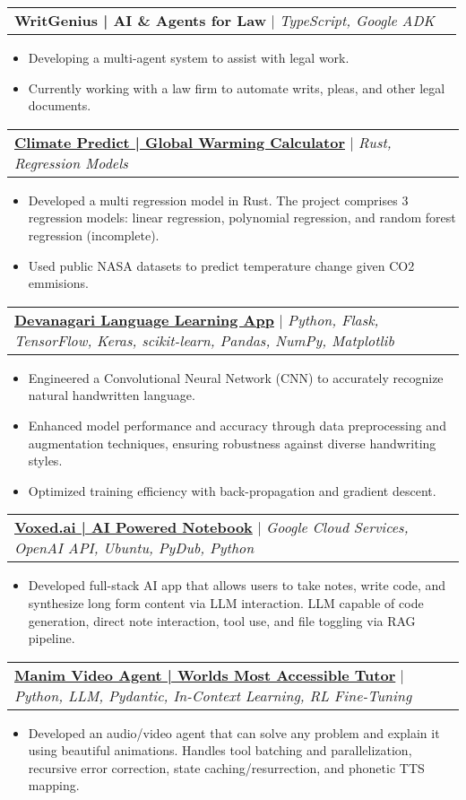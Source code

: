 \documentclass[letterpaper,10.99999999999999pt]{article}
\makeatletter
\newcommand{\resumeItem}[1]{
  \item\small{
    {#1 \vspace{-1pt}}
  }
}
\newcommand{\resumeProjectHeading}[2]{
    \item
    \begin{tabular*}{0.97\textwidth}{l@{\extracolsep{\fill}}r}
      \small#1 & #2 \\
    \end{tabular*}\vspace{-6pt}
}
\newcommand{\resumeItemListStart}{\begin{itemize}}
\newcommand{\resumeItemListEnd}{\end{itemize}\vspace{-5pt}}
\makeatother
\begin{document}
        \resumeProjectHeading
          {\textbf{WritGenius | AI \& Agents for Law} $|$ \emph{TypeScript, Google ADK}}{}
          \resumeItemListStart
            \resumeItem{Developing a multi-agent system to assist with legal work.}
            \resumeItem{Currently working with a law firm to automate writs, pleas, and other legal documents.}
          \resumeItemListEnd
    
      \resumeProjectHeading
        {\textbf{\href{https://www.aidanandrews.info/projects/climatepredict}{Climate Predict | Global Warming Calculator}} $|$ \emph{Rust, Regression Models}}{}
        \resumeItemListStart
          \resumeItem{Developed a multi regression model in Rust. The project comprises 3 regression models: linear regression, polynomial regression, and random forest regression (incomplete).}
          \resumeItem{Used public NASA datasets to predict temperature change given CO2 emmisions.}
        \resumeItemListEnd
          
      \resumeProjectHeading
          {\textbf{\href{https://www.aidanandrews.info/projects/devanagari-web-app}{Devanagari Language Learning App}} $|$ \emph{Python, Flask, TensorFlow, Keras, scikit-learn, Pandas, NumPy, Matplotlib}}{}
          \resumeItemListStart
            \resumeItem{Engineered a Convolutional Neural Network (CNN) to accurately recognize natural handwritten language.}
            \resumeItem{Enhanced model performance and accuracy through data preprocessing and augmentation techniques, ensuring robustness against diverse handwriting styles.}
            \resumeItem{Optimized training efficiency with back-propagation and gradient descent.}
          \resumeItemListEnd

      \resumeProjectHeading
        {\textbf{\href{https://www.aidanandrews.info/projects/voxed}{Voxed.ai | AI Powered Notebook}} $|$ \emph{Google Cloud Services, OpenAI API, Ubuntu, PyDub, Python}}{}
        \resumeItemListStart
          \resumeItem{Developed full-stack AI app that allows users to take notes, write code, and synthesize long form content via LLM interaction. LLM capable of code generation, direct note interaction, tool use, and file toggling via RAG pipeline.}
        \resumeItemListEnd
        
      \resumeProjectHeading
        {\textbf{\href{https://github.com/aidanandrews22/manim-video-agent}{Manim Video Agent | Worlds Most Accessible Tutor}} $|$ \emph{Python, LLM, Pydantic, In-Context Learning, RL Fine-Tuning}}{}
        \resumeItemListStart
          \resumeItem{Developed an audio/video agent that can solve any problem and explain it using beautiful animations. Handles tool batching and parallelization, recursive error correction, state caching/resurrection, and phonetic TTS mapping.}
        \resumeItemListEnd
\end{document}
